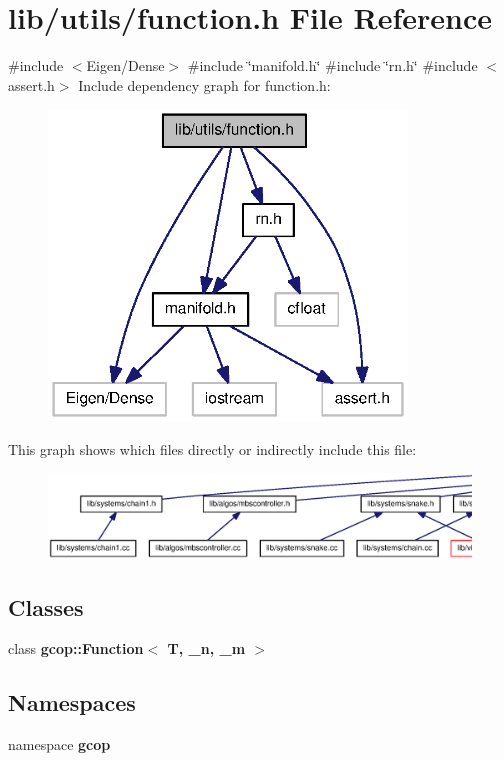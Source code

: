 \section{lib/utils/function.h \-File \-Reference}
\label{function_8h}
{\ttfamily \#include $<$\-Eigen/\-Dense$>$}\*
{\ttfamily \#include \char`\"{}manifold.\-h\char`\"{}}\*
{\ttfamily \#include \char`\"{}rn.\-h\char`\"{}}\*
{\ttfamily \#include $<$assert.\-h$>$}\*
\-Include dependency graph for function.\-h\-:
\nopagebreak
\begin{figure}[H]
\begin{center}
\leavevmode
\includegraphics[width=270pt]{function_8h__incl}
\end{center}
\end{figure}
\-This graph shows which files directly or indirectly include this file\-:
\nopagebreak
\begin{figure}[H]
\begin{center}
\leavevmode
\includegraphics[width=350pt]{function_8h__dep__incl}
\end{center}
\end{figure}
\subsection*{\-Classes}
\begin{DoxyCompactItemize}
\item 
class {\bf gcop\-::\-Function$<$ T, \-\_\-n, \-\_\-m $>$}
\end{DoxyCompactItemize}
\subsection*{\-Namespaces}
\begin{DoxyCompactItemize}
\item 
namespace {\bf gcop}
\end{DoxyCompactItemize}
